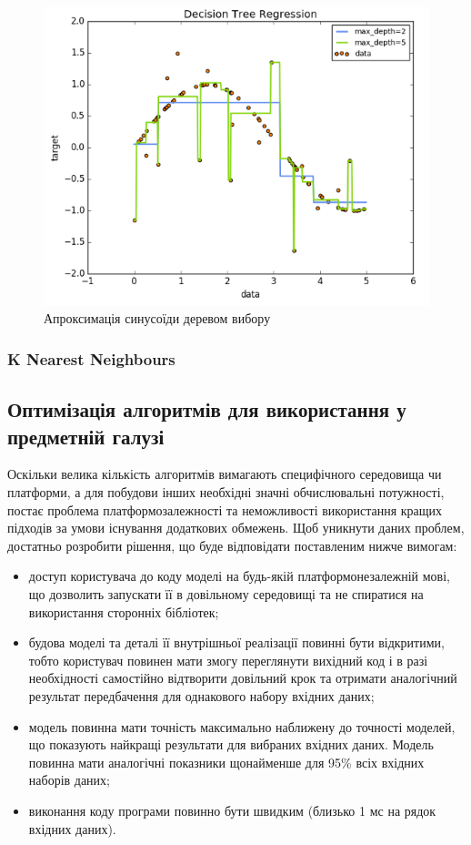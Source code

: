 \begin{figure}[h!]
  \includegraphics[width=\linewidth]{figures/decision_trees.png}
  \caption{Апроксимація синусоїди деревом вибору}
  \label{fig:decision_trees}
\end{figure}

\subsubsection{K Nearest Neighbours}



\subsection{Оптимізація алгоритмів для використання у предметній галузі}
Оскільки велика кількість алгоритмів вимагають специфічного середовища чи платформи, а для побудови інших необхідні значні обчислювальні потужності, постає проблема платформозалежності та неможливості використання кращих підходів за умови існування додаткових обмежень. Щоб уникнути даних проблем, достатньо розробити рішення, що буде відповідати поставленим нижче вимогам:
\begin{itemize}  
	\item доступ користувача до коду моделі на будь-якій платформонезалежній мові, що дозволить запускати її в довільному середовищі та не спиратися на використання сторонніх бібліотек;
	\item будова моделі та деталі її внутрішньої реалізації повинні бути відкритими, тобто користувач повинен мати змогу переглянути вихідний код і в разі необхідності самостійно відтворити довільний крок та отримати аналогічний результат передбачення для однакового набору вхідних даних;
	\item модель повинна мати точність максимально наближену до точності моделей, що показують найкращі результати для вибраних вхідних даних. Модель повинна мати аналогічні показники щонайменше для 95\% всіх вхідних наборів даних;
	\item виконання коду програми повинно бути швидким (близько 1 мс на рядок вхідних даних).
\end{itemize}

